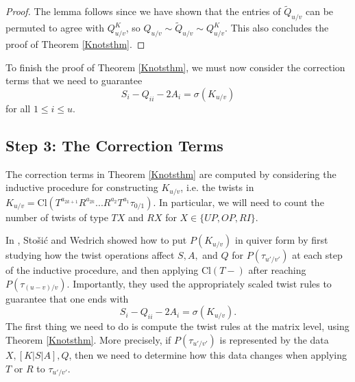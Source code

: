 \documentclass[11pt]{amsart}
\theoremstyle{plain}
\theoremstyle{definition}
\theoremstyle{remark}
\begin{document}
\begin{proof}
The lemma follows since we have shown that the entries of $\widetilde{Q}_{u/v}$ can be permuted to agree with $Q_{u/v}^K$, so $Q_{u/v}\sim\widetilde{Q}_{u/v}\sim Q_{u/v}^K$. This also concludes the proof of Theorem \ref{Knotsthm}.
\end{proof}

To finish the proof of Theorem \ref{Knotsthm}, we must now consider the correction terms that we need to guarantee
\[
S_i-Q_{ii}-2A_i=\sigma(K_{u/v})
\]
for all $1\leq i \leq u$.

\subsection{Step 3: The Correction Terms}
\label{cortermsec}


The correction terms in Theorem \ref{Knotsthm} are computed by considering the inductive procedure for constructing $K_{u/v}$, i.e. the twists in $K_{u/v}=\text{Cl}(T^{a_{2k+1}}R^{a_{2k}}...R^{a_2}T^{a_1}\tau_{0/1})$. In particular, we will need to count the number of twists of type $TX$ and $RX$ for $X\in\{UP,OP,RI\}$. 

In \cite{SW21}, Sto\v si\'c and Wedrich showed how to put $P(K_{u/v})$ in quiver form by first studying how the twist operations affect $S,A,$ and $Q$ for $P(\tau_{u'/v'})$ at each step of the inductive procedure, and then applying $\text{Cl}(T-)$ after reaching $P(\tau_{(u-v)/v})$. Importantly, they used the appropriately scaled twist rules to guarantee that one ends with 
\[
S_i-Q_{ii}-2A_i=\sigma(K_{u/v}).
\]
The first thing we need to do is compute the twist rules at the matrix level, using Theorem \ref{Knotsthm}. More precisely, if $P(\tau_{u'/v'})$ is represented by the data $X, [K|S|A], Q$, then we need to determine how this data changes when applying $T$ or $R$ to $\tau_{u'/v'}$. 
\end{document}
